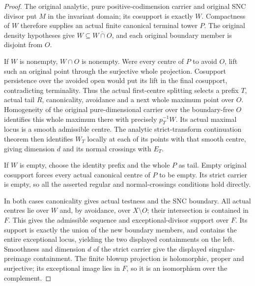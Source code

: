 \begin{proof}
The original analytic, pure positive-codimension carrier and original
SNC divisor put $M$ in the invariant domain; its cosupport is exactly
$W$.  Compactness of $W$ therefore supplies an actual finite canonical
terminal tower $P$.  The original density hypotheses give
$W\subseteq\overline{W\cap O}$, and each original boundary member is
disjoint from $O$.

If $W$ is nonempty, $W\cap O$ is nonempty.  Were every centre of $P$
to avoid $O$, lift such an original point through the surjective whole
projection.  Cosupport persistence over the avoided open would put its
lift in the final cosupport, contradicting terminality.  Thus the
actual first-centre splitting selects a prefix $T$, actual tail $R$,
canonicality, avoidance and a next whole maximum point over $O$.
Homogeneity of the original pure-dimensional carrier over the
boundary-free $O$ identifies this whole maximum there with precisely
$p_T^{-1}W$.  Its actual maximal locus is a smooth admissible centre.
The analytic strict-transform continuation theorem then identifies
$W_T$ locally at each of its points with that smooth centre, giving
dimension $d$ and its normal crossings with $E_T$.

If $W$ is empty, choose the identity prefix and the whole $P$ as tail.
Empty original cosupport forces every actual canonical centre of $P$
to be empty.  Its strict carrier is empty, so all the asserted regular
and normal-crossings conditions hold directly.

In both cases canonicality gives actual testness and the SNC boundary.
All actual centres lie over $W$ and, by avoidance, over $X\setminus O$;
their intersection is contained in $F$.  This gives the admissible
sequence and exceptional-divisor support over $F$.  Its support is
exactly the union of the new boundary members, and contains the entire
exceptional locus, yielding the two displayed containments on the
left.  Smoothness and dimension $d$ of the strict carrier give the
displayed singular-preimage containment.  The finite blowup projection
is holomorphic, proper and surjective; its exceptional image lies in
$F$, so it is an isomorphism over the complement.
\end{proof}

